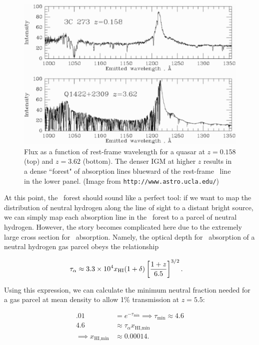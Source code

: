 \begin{figure}[h]
  \centering
  \includegraphics[width=12cm]{Lya-forest-60.eps}
  \caption{Flux as a function of rest-frame wavelength for a quasar at $z = 0.158$ (top) and $z = 3.62$ (bottom). The denser IGM at higher $z$ results in a dense ``forest" of absorption lines blueward of the rest-frame \lya\ line in the lower panel. (Image from {\tt http://www.astro.ucla.edu/})}
  \label{fig:LyaExample}
\end{figure}

At this point, the \lya\ forest should sound like a perfect tool: if we want to map the distribution of neutral hydrogen along the line of sight to a distant bright source, we can simply map each absorption line in the \lya\ forest to a parcel of neutral hydrogen. However, the story becomes complicated here due to the extremely large cross section for \lya\ absorption. Namely, the optical depth for \lya\ absorption of a neutral hydrogen gas parcel obeys the relationship

\begin{align}
\tau_{\alpha} &\approx 3.3 \times 10^{4} x_{\text{HI}} (1 + \delta) \left[\dfrac{1+z}{6.5}\right]^{3/2}. \label{eq:tauGP}
\end{align}

Using this expression, we can calculate the minimum neutral fraction needed for a gas parcel at mean density to allow 1\% transmission at $z = 5.5$:

\begin{align}
.01 &= e^{-\tau_{\text{min}}} \implies \tau_{\text{min}} \approx 4.6\\
4.6 &\approx \tau_{\alpha} x_{\text{HI,min}} \\
\implies x_{\text{HI,min}} &\approx 0.00014.
\end{align}


